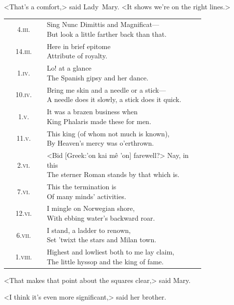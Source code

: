 <That's a comfort,> said Lady~Mary. <It shows we're on the right lines.>

\begin{longtable} {c p{0.8\linewidth}} 
4.\textsc{iii.} &  \makecell[l]{Sing Nunc Dimittis and Magnificat—\\
But look a little farther back than that.}\\
14.\textsc{iii.} &  \makecell[l]{Here in brief epitome\\
Attribute of royalty.}\\
1.\textsc{iv.} &  \makecell[l]{Lo! at a glance\\
The Spanish gipsy and her dance.}\\
10.\textsc{iv.} &  \makecell[l]{Bring me skin and a needle or a stick—\\
A needle does it slowly, a stick does it quick.}\\
1.\textsc{v.} &  \makecell[l]{It was a brazen business when\\
King Phalaris made these for men.}\\
11.\textsc{v.} &  \makecell[l]{This king (of whom not much is known),\\
By Heaven's mercy was o'erthrown.}\\
2.\textsc{vi.} &  \makecell[l]{<Bid [Greek:'on kai mê 'on] farewell?> Nay, in this\\
The sterner Roman stands by that which is.}\\
7.\textsc{vi.} &  \makecell[l]{This the termination is\\
Of many minds' activities.}\\
12.\textsc{vi.} &  \makecell[l]{I mingle on Norwegian shore,\\
With ebbing water's backward roar.}\\
6.\textsc{vii.} &  \makecell[l]{I stand, a ladder to renown,\\
Set 'twixt the stars and Milan town.}\\
1.\textsc{viii.} &  \makecell[l]{Highest and lowliest both to me lay claim,\\
The little hyssop and the king of fame.}\\
\end{longtable}


<That makes that point about the squares clear,> said Mary.

<I think it's even more significant,> said her brother.

